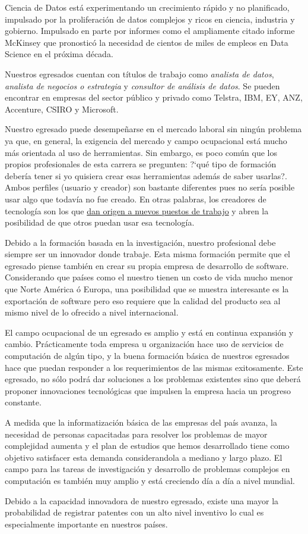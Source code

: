 Ciencia de Datos está experimentando un crecimiento rápido y no planificado, impulsado por la proliferación de datos complejos y ricos en ciencia, industria y gobierno. Impulsado en parte por informes como el ampliamente citado informe McKinsey que pronosticó la necesidad de cientos de miles de empleos en Data Science en el próxima década.

Nuestros egresados cuentan con tí­tulos de trabajo como \emph{analista de datos}, \emph{analista de negocios o estrategia} y \emph{consultor de análisis de datos}. Se pueden encontrar en empresas del sector público y privado como Telstra, IBM, EY, ANZ, Accenture, CSIRO y Microsoft.

Nuestro egresado puede desempeñarse en el mercado laboral sin ningún problema ya que, en general, la exigencia del mercado y campo ocupacional está mucho más orientada al uso de herramientas. Sin embargo, 
es poco común que los propios profesionales de esta carrera se pregunten: ?`qué tipo de formación deberí­a tener si yo quisiera crear esas herramientas además de saber usarlas?. Ambos perfiles (usuario y creador) 
son bastante diferentes pues no serí­a posible usar algo que todaví­a no fue creado. En otras palabras, 
los creadores de tecnologí­a son los que \underline{dan origen a nuevos puestos de trabajo} y abren la 
posibilidad de que otros puedan usar esa tecnologí­a.

Debido a la formación basada en la investigación, nuestro profesional debe siempre ser un innovador 
donde trabaje. Esta misma formación permite que el egresado piense también en crear su propia empresa 
de desarrollo de software. Considerando que paí­ses como el nuestro tienen un costo de vida mucho menor 
que Norte América ó Europa, una posibilidad que se muestra interesante es la exportación de software 
pero eso requiere que la calidad del producto sea al mismo nivel de lo ofrecido a nivel internacional.

El campo ocupacional de un egresado es amplio y está en continua expansión y cambio. Prácticamente 
toda empresa u organización hace uso de servicios de computación de algún tipo, y la buena formación 
básica de nuestros egresados hace que puedan responder a los requerimientos de las mismas exitosamente. 
Este egresado, no sólo podrá dar soluciones a los problemas existentes sino que deberá proponer innovaciones 
tecnológicas que impulsen la empresa hacia un progreso constante.

A medida que la informatización básica de las empresas del paí­s avanza, la necesidad de personas 
capacitadas para resolver los problemas de mayor complejidad aumenta y el plan de estudios que hemos 
desarrollado tiene como objetivo satisfacer esta demanda considerandola a mediano y largo plazo. El campo 
para las tareas de investigación y desarrollo de problemas complejos en computación es también muy amplio 
y está creciendo dí­a a dí­a a nivel mundial.

Debido a la capacidad innovadora de nuestro egresado, existe una mayor la probabilidad de registrar 
patentes con un alto nivel inventivo lo cual es especialmente importante en nuestros paí­ses.
